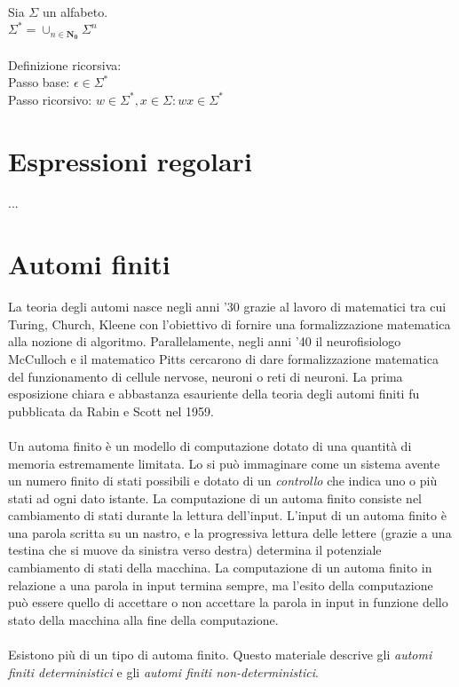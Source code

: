\documentclass[]{article}
\begin{document}
Sia \mbox{$ \Sigma $} un alfabeto.
\\
\mbox{$ \Sigma^* = \cup_{n \in \mathbf{N_0}}{\Sigma^n} $}
\\
\\
Definizione ricorsiva:
\\
Passo base: \mbox{$ \epsilon \in \Sigma^* $}
\\
Passo ricorsivo: \mbox{$ w \in \Sigma^*, x \in \Sigma \colon wx \in \Sigma^* $}



\newpage



\section{Espressioni regolari}

...



\newpage



\section{Automi finiti}

La teoria degli automi nasce negli anni '30 grazie al lavoro di matematici tra cui Turing, Church, Kleene
con l'obiettivo di fornire una formalizzazione matematica alla nozione di algoritmo. Parallelamente, negli
anni '40 il neurofisiologo McCulloch e il matematico Pitts cercarono di dare formalizzazione matematica del
funzionamento di cellule nervose, neuroni o reti di neuroni. La prima esposizione chiara e abbastanza
esauriente della teoria degli automi finiti fu pubblicata da Rabin e Scott nel 1959.
\\
\\
Un automa finito è un modello di computazione dotato di una quantità di memoria estremamente limitata. Lo
si può immaginare come un sistema avente un numero finito di stati possibili e dotato di un \textit{controllo}
che indica uno o più stati ad ogni dato istante. La computazione di un automa finito consiste nel cambiamento
di stati durante la lettura dell'input. L'input di un automa finito è una parola scritta su un nastro, e la
progressiva lettura delle lettere (grazie a una testina che si muove da sinistra verso destra) determina il
potenziale cambiamento di stati della macchina. La computazione di un automa finito in relazione a una
parola in input termina sempre, ma l'esito della computazione può essere quello di accettare o non accettare
la parola in input in funzione dello stato della macchina alla fine della computazione.
\\
\\
Esistono più di un tipo di automa finito. Questo materiale descrive gli \textit{automi finiti deterministici}
e gli \textit{automi finiti non-deterministici}.
\end{document}
